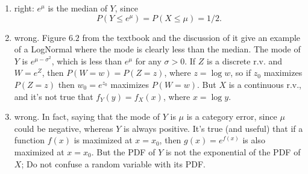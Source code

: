 
\setcounter{theorem}{8}
\begin{exercise} [BH.6.9]
\begin{solution}
    \begin{enumerate}
        \item  right: $e^\mu$ is the median of $Y$, since
        $$
        P\left(Y \leq e^\mu\right)=P(X \leq \mu)=1 / 2 .
        $$
        \item  wrong. Figure $6.2$ from the textbook and the discussion of it give an example of a LogNormal where the mode is clearly less than the median. The mode of $Y$ is $e^{\mu-\sigma^2}$, which is less than $e^\mu$ for any $\sigma>0$.
        If $Z$ is a discrete r.v. and $W=e^Z$, then $P(W=w)=P(Z=z)$, where $z=\log w$, so if $z_0$ maximizes $P(Z=z)$ then $w_0=e^{z_0}$ maximizes $P(W=w)$. But $X$ is a continuous r.v., and it's not true that $f_Y(y)=f_X(x)$, where $x=\log y$.
        \item wrong. In fact, saying that the mode of $Y$ is $\mu$ is a category error, since $\mu$ could be negative, whereas $Y$ is always positive. It's true (and useful) that if a function $f(x)$ is maximized at $x=x_0$, then $g(x)=e^{f(x)}$ is also maximized at $x=x_0$. But the PDF of $Y$ is not the exponential of the PDF of $X$; Do not confuse a random variable with its PDF.
    \end{enumerate}
\end{solution}
\end{exercise}

